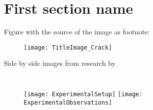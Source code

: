 

\section{First section name}%


\begin{frame}
    \vspace{9mm}
    Figure with the source of the image as footnote:\\
    \begin{figure}[H] \begin{center}
        \texttt{[image: TitleImage\_Crack]}
    \end{center} \end{figure}
\end{frame}



\begin{frame}
    Side by side images from research by \cite{Web_Experiment}
    \begin{columns}
    \column{\dimexpr\paperwidth}
    \begin{figure}%
        \texttt{[image: ExperimentalSetup]}%
               \hspace{\dimexpr0.02\textwidth}%
        \texttt{[image: ExperimentalObservations]}%
    \end{figure}%
    \end{columns}
\end{frame}



